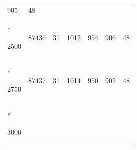 \documentclass[
  12pt,
  oneside,
  openany]{book}
\begin{document}
\begin{appendices}
\begin{singlespace}
\begin{longtable}[]{@{}lllllll@{}}
\begin{minipage}[t]{0.07\columnwidth}
905\strut
\end{minipage} & \begin{minipage}[t]{0.10\columnwidth}\raggedright
48\strut
\end{minipage}\tabularnewline*
\begin{minipage}[t]{0.13\columnwidth}\raggedright
2500\strut
\end{minipage} & \begin{minipage}[t]{0.16\columnwidth}\raggedright
87436\strut
\end{minipage} & \begin{minipage}[t]{0.16\columnwidth}\raggedright
31\strut
\end{minipage} & \begin{minipage}[t]{0.11\columnwidth}\raggedright
1012\strut
\end{minipage} & \begin{minipage}[t]{0.07\columnwidth}\raggedright
954\strut
\end{minipage} & \begin{minipage}[t]{0.07\columnwidth}\raggedright
906\strut
\end{minipage} & \begin{minipage}[t]{0.10\columnwidth}\raggedright
48\strut
\end{minipage}\tabularnewline*
\begin{minipage}[t]{0.13\columnwidth}\raggedright
2750\strut
\end{minipage} & \begin{minipage}[t]{0.16\columnwidth}\raggedright
87437\strut
\end{minipage} & \begin{minipage}[t]{0.16\columnwidth}\raggedright
31\strut
\end{minipage} & \begin{minipage}[t]{0.11\columnwidth}\raggedright
1014\strut
\end{minipage} & \begin{minipage}[t]{0.07\columnwidth}\raggedright
950\strut
\end{minipage} & \begin{minipage}[t]{0.07\columnwidth}\raggedright
902\strut
\end{minipage} & \begin{minipage}[t]{0.10\columnwidth}\raggedright
48\strut
\end{minipage}\tabularnewline*
\begin{minipage}[t]{0.13\columnwidth}\raggedright
3000\strut
\end{minipage} & \begin{minipage}[t]{0.16\columnwidth}\raggedright

\end{minipage}
\end{longtable}
\end{singlespace}
\end{appendices}
\end{document}
